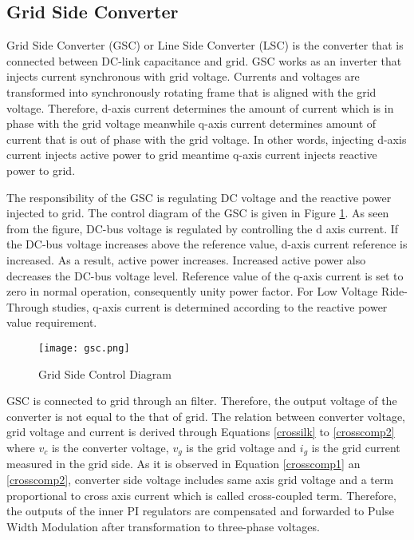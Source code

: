 \subsection{Grid Side Converter}
Grid Side Converter (GSC) or Line Side Converter (LSC) is the converter that is connected between DC-link capacitance and grid. GSC works as an inverter that injects current synchronous with grid voltage. Currents and voltages are transformed into synchronously rotating frame that is aligned with the grid voltage. Therefore, d-axis current determines the amount of current which is in phase with the grid voltage meanwhile q-axis current determines amount of current that is out of phase with the grid voltage. In other words, injecting d-axis current injects active power to grid meantime q-axis current injects reactive power to grid. \par
The responsibility of the GSC is regulating DC voltage and the reactive power injected to grid. The control diagram of the GSC is given in Figure \ref{gsc}. As seen from the figure, DC-bus voltage is regulated by controlling the d axis current. If the DC-bus voltage increases above the reference value, d-axis current reference is increased. As a result, active power increases. Increased active power also decreases the DC-bus voltage level. Reference value of the q-axis current is set to zero in normal operation, consequently unity power factor. For Low Voltage Ride-Through studies, q-axis current is determined according to the reactive power value requirement. \cite{Orowska-Kowalska2014} \par
\begin{figure}[h!]
	\centering
	\texttt{[image: gsc.png]}
	\caption{Grid Side Control Diagram}
	\label{gsc}
\end{figure}
GSC is connected to grid through an filter. Therefore, the output voltage of the converter is not equal to the that of grid. The relation between converter voltage, grid voltage and current is derived through Equations \ref{crossilk} to \ref{crosscomp2} where $v_{c}$ is the converter voltage, $v_{g}$ is the grid voltage and  $i_{g}$ is the grid current measured in the grid side. As it is observed in Equation \ref{crosscomp1} an \ref{crosscomp2}, converter side voltage includes same axis grid voltage and a term proportional to cross axis current which is called cross-coupled term. Therefore, the outputs of the inner PI regulators are compensated and forwarded to Pulse Width Modulation after transformation to three-phase voltages.

